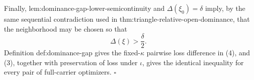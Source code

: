 Finally, lem:dominance-gap-lower-semicontinuity and \(\Delta(\xi_0)=\delta\) imply, by the same sequential contradiction used in thm:triangle-relative-open-dominance, that the neighborhood may be chosen so that
\[
\Delta(\xi)>\frac\delta2.
\tag{4}
\]
Definition def:dominance-gap gives the fixed-\(\kappa\) pairwise loss difference in (4), and (3), together with preservation of loss under \(\iota\), gives the identical inequality for every pair of full-carrier optimizers.  \(\square\)